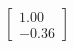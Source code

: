 \documentclass[preview]{standalone}
\begin{document}
\begin{align*}
\begin{bmatrix} 1.00 \\ -0.36 \end{bmatrix}
\end{align*}
\end{document}

